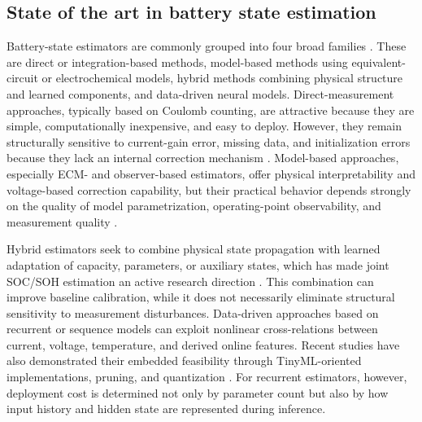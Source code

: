 \documentclass[review,nopreprintline]{elsarticle}
\begin{document}
\subsection{State of the art in battery state estimation}
Battery-state estimators are commonly grouped into four broad families \cite{khanComparativeStudyDifferent2022,shrivastavaReviewTechnologicalAdvancement2023,guoSystematicReviewElectrochemical2024,yaoSmarterBatteryManagement2025b}. These are direct or integration-based methods, model-based methods using equivalent-circuit or electrochemical models, hybrid methods combining physical structure and learned components, and data-driven neural models. Direct-measurement approaches, typically based on Coulomb counting, are attractive because they are simple, computationally inexpensive, and easy to deploy. However, they remain structurally sensitive to current-gain error, missing data, and initialization errors because they lack an internal correction mechanism \cite{khanComparativeStudyDifferent2022,liRobustnessSOCEstimation2015}. Model-based approaches, especially ECM- and observer-based estimators, offer physical interpretability and voltage-based correction capability, but their practical behavior depends strongly on the quality of model parametrization, operating-point observability, and measurement quality \cite{gaoEnhancedStateofchargeEstimation2022,guoSystematicReviewElectrochemical2024,liRobustnessSOCEstimation2015}.

Hybrid estimators seek to combine physical state propagation with learned adaptation of capacity, parameters, or auxiliary states, which has made joint SOC/SOH estimation an active research direction \cite{gaoCoEstimationStateofChargeStateof2022,shenAlternativeCombinedCoestimation2022,wangFusionEstimationLithiumion2022}. This combination can improve baseline calibration, while it does not necessarily eliminate structural sensitivity to measurement disturbances. Data-driven approaches based on recurrent or sequence models can exploit nonlinear cross-relations between current, voltage, temperature, and derived online features. Recent studies have also demonstrated their embedded feasibility through TinyML-oriented implementations, pruning, and quantization \cite{mondalEstimatingStateofChargeLithiumIon2024,Embedded_AI_only_SOC_mobile,giazitzisCaseStudyTiny2024,mazziStateChargeEstimation2022,yaoSmarterBatteryManagement2025b}. For recurrent estimators, however, deployment cost is determined not only by parameter count but also by how input history and hidden state are represented during inference.
\end{document}
